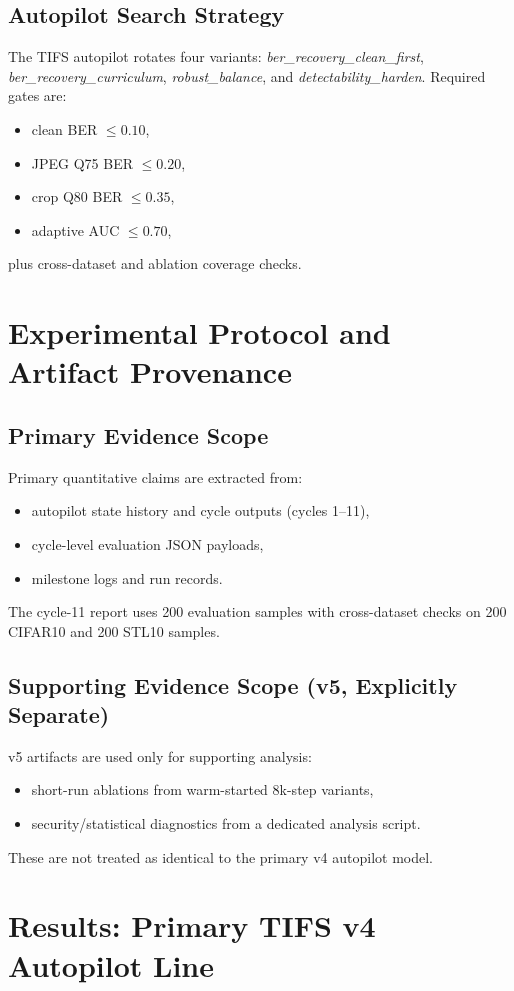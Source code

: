 \documentclass[journal]{IEEEtran}
\begin{document}
\subsection{Autopilot Search Strategy}
The TIFS autopilot rotates four variants: \emph{ber\_recovery\_clean\_first}, \emph{ber\_recovery\_curriculum}, \emph{robust\_balance}, and \emph{detectability\_harden}. Required gates are:
\begin{itemize}
\item clean BER $\leq 0.10$,
\item JPEG Q75 BER $\leq 0.20$,
\item crop Q80 BER $\leq 0.35$,
\item adaptive AUC $\leq 0.70$,
\end{itemize}
plus cross-dataset and ablation coverage checks.

\section{Experimental Protocol and Artifact Provenance}
\subsection{Primary Evidence Scope}
Primary quantitative claims are extracted from:
\begin{itemize}
\item autopilot state history and cycle outputs (cycles 1--11),
\item cycle-level evaluation JSON payloads,
\item milestone logs and run records.
\end{itemize}
The cycle-11 report uses 200 evaluation samples with cross-dataset checks on 200 CIFAR10 and 200 STL10 samples.

\subsection{Supporting Evidence Scope (v5, Explicitly Separate)}
v5 artifacts are used only for supporting analysis:
\begin{itemize}
\item short-run ablations from warm-started 8k-step variants,
\item security/statistical diagnostics from a dedicated analysis script.
\end{itemize}
These are not treated as identical to the primary v4 autopilot model.

\section{Results: Primary TIFS v4 Autopilot Line}
\end{document}

